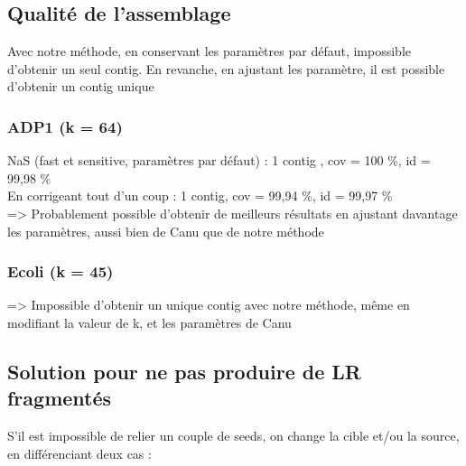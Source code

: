 \documentclass[12pt]{article}
\begin{document}
\subsection{Qualité de l'assemblage}

Avec notre méthode, en conservant les paramètres par défaut, impossible d'obtenir un seul contig. En revanche, en ajustant les paramètre, il est possible d'obtenir un contig unique

\subsubsection{ADP1 (k = 64)}

NaS (fast et sensitive, paramètres par défaut) : 1 contig , cov = 100 \%, id = 99,98 \% \\

En corrigeant tout d'un coup : 1 contig, cov = 99,94 \%, id = 99,97 \% \\

=> Probablement possible d'obtenir de meilleurs résultats en ajustant davantage les paramètres, aussi bien de Canu que de notre méthode


\subsubsection{Ecoli (k = 45)}

=> Impossible d'obtenir un unique contig avec notre méthode, même en modifiant la valeur de k, et les paramètres de Canu

\newpage

\subsection{Solution pour ne pas produire de LR fragmentés}

S'il est impossible de relier un couple de seeds, on change la cible et/ou la source, en différenciant deux cas : \\
\end{document}
